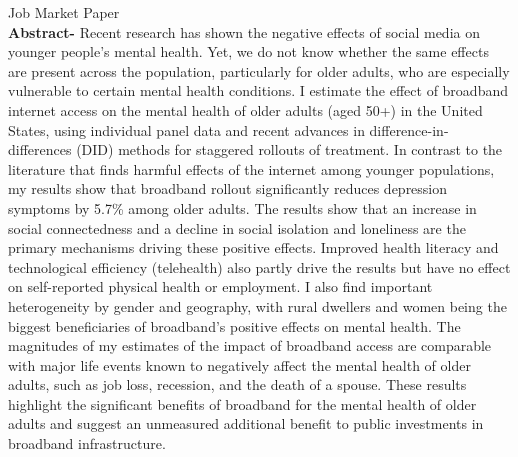 \documentclass{resume} %
\begin{document}
\begin{rSection}{Job Market Paper}
\\
\textbf{Abstract-} 
Recent research has shown the negative effects of social media on younger people's mental health. Yet, we do not know whether the same effects are present across the population, particularly for older adults, who are especially vulnerable to certain mental health conditions.
I estimate the effect of broadband internet access on the mental health of older adults (aged 50+) in the United States, using individual panel data and recent advances in difference-in-differences (DID) methods for staggered rollouts of treatment.
In contrast to the literature that finds harmful effects of the internet among younger populations, my results show that broadband rollout significantly reduces depression symptoms by 5.7\% among older adults. The results show that an increase in social connectedness and a decline in social isolation and loneliness are the primary mechanisms driving these positive effects. Improved health literacy and technological efficiency (telehealth) also partly drive the results but have no effect on self-reported physical health or employment.
I also find important heterogeneity by gender and geography, with rural dwellers and women being the biggest beneficiaries of broadband's positive effects on mental health. 
The magnitudes of my estimates of the impact of broadband access are comparable with major life events known to negatively affect the mental health of older adults, such as job loss, recession, and the death of a spouse. These results highlight the significant benefits of broadband for the mental health of older adults and suggest an unmeasured additional benefit to public investments in broadband infrastructure.  


\end{rSection}
\end{document}
